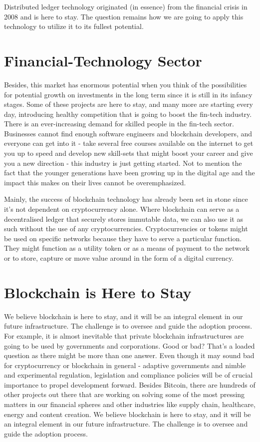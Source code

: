 Distributed ledger technology originated (in essence) from the financial crisis in 2008 and is here to stay. The question remains how we are going to apply this technology to utilize it to its fullest potential. 


\section{Financial-Technology Sector}
Besides, this market has enormous potential when you think of the possibilities for potential growth on investments in the long term since it is still in its infancy stages. Some of these projects are here to stay, and many more are starting every day, introducing healthy competition that is going to boost the fin-tech industry. There is an ever-increasing demand for skilled people in the fin-tech sector. Businesses cannot find enough software engineers and blockchain developers, and everyone can get into it - take several free courses available on the internet to get you up to speed and develop new skill-sets that might boost your career and give you a new direction - this industry is just getting started. Not to mention the fact that the younger generations have been growing up in the digital age and the impact this makes on their lives cannot be overemphasized.\medskip

Mainly, the success of blockchain technology has already been set in stone since it's not dependent on cryptocurrency alone. Where blockchain can serve as a decentralised ledger that securely stores immutable data, we can also use it as such without the use of any cryptocurrencies. Cryptocurrencies or tokens might be used on specific networks because they have to serve a particular function. They might function as a utility token or as a means of payment to the network or to store, capture or move value around in the form of a digital currency.\medskip


\section{Blockchain is Here to Stay}
We believe blockchain is here to stay, and it will be an integral element in our future infrastructure. The challenge is to oversee and guide the adoption process. For example, it is almost inevitable that private blockchain infrastructures are going to be used by governments and corporations. Good or bad? That's a loaded question as there might be more than one answer. Even though it may sound bad for cryptocurrency or blockchain in general - adaptive governments and nimble and experimental regulation, legislation and compliance policies will be of crucial importance to propel development forward. 
Besides Bitcoin, there are hundreds of other projects out there that are working on solving some of the most pressing matters in our financial spheres and other industries like supply chain, healthcare, energy and content creation. We believe blockchain is here to stay, and it will be an integral element in our future infrastructure.  The challenge is to oversee and guide the adoption process.

